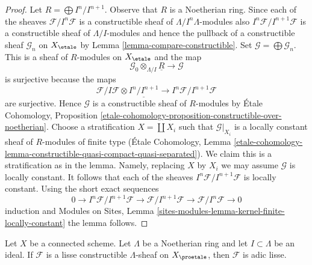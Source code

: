 \begin{proof}
Let $R = \bigoplus I^n/I^{n + 1}$. Observe that $R$ is a Noetherian ring.
Since each of the sheaves
$\mathcal{F}/I^n\mathcal{F}$ is a constructible sheaf of
$\Lambda/I^n\Lambda$-modules also $I^n\mathcal{F}/I^{n + 1}\mathcal{F}$
is a constructible sheaf of $\Lambda/I$-modules and hence the pullback
of a constructible sheaf $\mathcal{G}_n$ on $X_\etale$ by
Lemma \ref{lemma-compare-constructible}.
Set $\mathcal{G} = \bigoplus \mathcal{G}_n$. This is a sheaf
of $R$-modules on $X_\etale$ and the map
$$
\mathcal{G}_0 \otimes_{\Lambda/I} \underline{R}
\longrightarrow
\mathcal{G}
$$
is surjective because the maps
$$
\mathcal{F}/I\mathcal{F} \otimes \underline{I^n/I^{n + 1}} \to
I^n\mathcal{F}/I^{n + 1}\mathcal{F}
$$
are surjective. Hence $\mathcal{G}$ is a constructible sheaf of
$R$-modules by \'Etale Cohomology, Proposition
\ref{etale-cohomology-proposition-constructible-over-noetherian}.
Choose a stratification $X = \coprod X_i$ such that
$\mathcal{G}|_{X_i}$ is a locally constant sheaf of $R$-modules
of finite type (\'Etale Cohomology, Lemma
\ref{etale-cohomology-lemma-constructible-quasi-compact-quasi-separated}).
We claim this is a stratification as in the lemma.
Namely, replacing $X$ by $X_i$ we may assume $\mathcal{G}$ is locally
constant. It follows that each of the sheaves
 $I^n\mathcal{F}/I^{n + 1}\mathcal{F}$
is locally constant. Using the short exact sequences
$$
0 \to I^n\mathcal{F}/I^{n + 1}\mathcal{F} \to
\mathcal{F}/I^{n + 1}\mathcal{F} \to \mathcal{F}/I^n\mathcal{F} \to 0
$$
induction and Modules on Sites, Lemma
\ref{sites-modules-lemma-kernel-finite-locally-constant}
the lemma follows.
\end{proof}

\begin{lemma}
\label{lemma-connected-lisse}
Let $X$ be a connected scheme. Let $\Lambda$ be a Noetherian ring and let
$I \subset \Lambda$ be an ideal. If $\mathcal{F}$ is a lisse
constructible $\Lambda$-sheaf on $X_\proetale$, then $\mathcal{F}$
is adic lisse.
\end{lemma}

